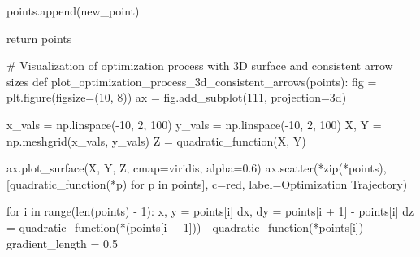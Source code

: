 \documentclass[
  letterpaper,
  DIV=11,
  numbers=noendperiod]{scrreprt}
\newenvironment{Shaded}{\begin{snugshade}}{\end{snugshade}}
\newcommand{\BuiltInTok}[1]{\textcolor[rgb]{0.00,0.23,0.31}{#1}}
\newcommand{\CommentTok}[1]{\textcolor[rgb]{0.37,0.37,0.37}{#1}}
\newcommand{\ControlFlowTok}[1]{\textcolor[rgb]{0.00,0.23,0.31}{#1}}
\newcommand{\DecValTok}[1]{\textcolor[rgb]{0.68,0.00,0.00}{#1}}
\newcommand{\FloatTok}[1]{\textcolor[rgb]{0.68,0.00,0.00}{#1}}
\newcommand{\KeywordTok}[1]{\textcolor[rgb]{0.00,0.23,0.31}{#1}}
\newcommand{\NormalTok}[1]{\textcolor[rgb]{0.00,0.23,0.31}{#1}}
\newcommand{\OperatorTok}[1]{\textcolor[rgb]{0.37,0.37,0.37}{#1}}
\newcommand{\StringTok}[1]{\textcolor[rgb]{0.13,0.47,0.30}{#1}}
\begin{document}
\begin{tcolorbox}
\begin{Shaded}
\begin{Highlighting}[]
\NormalTok{        points.append(new\_point)}
        
    \ControlFlowTok{return}\NormalTok{ points}

\CommentTok{\# Visualization of optimization process with 3D surface and consistent arrow sizes}
\KeywordTok{def}\NormalTok{ plot\_optimization\_process\_3d\_consistent\_arrows(points):}
\NormalTok{    fig }\OperatorTok{=}\NormalTok{ plt.figure(figsize}\OperatorTok{=}\NormalTok{(}\DecValTok{10}\NormalTok{, }\DecValTok{8}\NormalTok{))}
\NormalTok{    ax }\OperatorTok{=}\NormalTok{ fig.add\_subplot(}\DecValTok{111}\NormalTok{, projection}\OperatorTok{=}\StringTok{\textquotesingle{}3d\textquotesingle{}}\NormalTok{)}

\NormalTok{    x\_vals }\OperatorTok{=}\NormalTok{ np.linspace(}\OperatorTok{{-}}\DecValTok{10}\NormalTok{, }\DecValTok{2}\NormalTok{, }\DecValTok{100}\NormalTok{)}
\NormalTok{    y\_vals }\OperatorTok{=}\NormalTok{ np.linspace(}\OperatorTok{{-}}\DecValTok{10}\NormalTok{, }\DecValTok{2}\NormalTok{, }\DecValTok{100}\NormalTok{)}
\NormalTok{    X, Y }\OperatorTok{=}\NormalTok{ np.meshgrid(x\_vals, y\_vals)}
\NormalTok{    Z }\OperatorTok{=}\NormalTok{ quadratic\_function(X, Y)}

\NormalTok{    ax.plot\_surface(X, Y, Z, cmap}\OperatorTok{=}\StringTok{\textquotesingle{}viridis\textquotesingle{}}\NormalTok{, alpha}\OperatorTok{=}\FloatTok{0.6}\NormalTok{)}
\NormalTok{    ax.scatter(}\OperatorTok{*}\BuiltInTok{zip}\NormalTok{(}\OperatorTok{*}\NormalTok{points), [quadratic\_function(}\OperatorTok{*}\NormalTok{p) }\ControlFlowTok{for}\NormalTok{ p }\KeywordTok{in}\NormalTok{ points], c}\OperatorTok{=}\StringTok{\textquotesingle{}red\textquotesingle{}}\NormalTok{, label}\OperatorTok{=}\StringTok{\textquotesingle{}Optimization Trajectory\textquotesingle{}}\NormalTok{)}

    \ControlFlowTok{for}\NormalTok{ i }\KeywordTok{in} \BuiltInTok{range}\NormalTok{(}\BuiltInTok{len}\NormalTok{(points) }\OperatorTok{{-}} \DecValTok{1}\NormalTok{):  }
\NormalTok{        x, y }\OperatorTok{=}\NormalTok{ points[i]}
\NormalTok{        dx, dy }\OperatorTok{=}\NormalTok{ points[i }\OperatorTok{+} \DecValTok{1}\NormalTok{] }\OperatorTok{{-}}\NormalTok{ points[i]}
\NormalTok{        dz }\OperatorTok{=}\NormalTok{ quadratic\_function(}\OperatorTok{*}\NormalTok{(points[i }\OperatorTok{+} \DecValTok{1}\NormalTok{])) }\OperatorTok{{-}}\NormalTok{ quadratic\_function(}\OperatorTok{*}\NormalTok{points[i])}
\NormalTok{        gradient\_length }\OperatorTok{=} \FloatTok{0.5}


\end{Highlighting}
\end{Shaded}
\end{tcolorbox}
\end{document}
